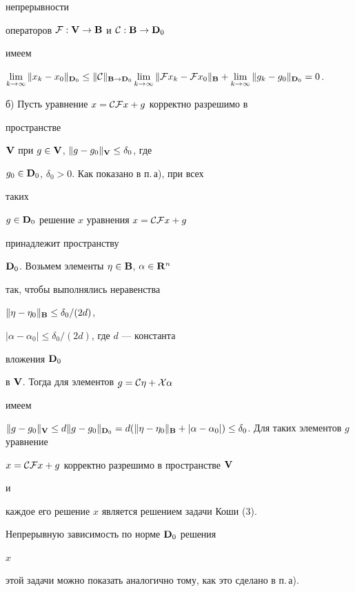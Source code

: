 \begin{pf}
непрерывности


операторов ${\cal F}:\spc{V}\to\spc{B}$ и ${\cal


C}:\spc{B}\to\spc{D}_0$


имеем


$\lim\limits_{k\to\infty}\|x_k-x_0\|_{\bold{D}_0}\le


\|{\cal C}\|_{\bold{B}\to{\bold{D}_0}}


\lim\limits_{k\to\infty}\|{\cal F}x_k-{\cal F}x_0\|_{\bold B}+


\lim\limits_{k\to\infty}\|g_k-g_0\|_{\bold{D}_0}=0$.





б) Пусть уравнение $x={\cal C}{\cal F}x+g$ корректно разрешимо в


пространстве


$\bold {V}$ при $g\in\bold {V}$, $\|g-g_0\|_{\bold V}\le\delta_0$, где


$g_0\in\bold {D}_0$, $\delta_0>0$. Как показано в п.\,а), при всех


таких


$g\in\bold {D}_0$ решение $x$ уравнения $x={\cal C}{\cal F}x+g$


принадлежит пространству


$\bold {D}_0$. Возьмем элементы $\eta\in\bold {B}$, $\alpha\in\bold {R}^n$


так, чтобы выполнялись неравенства


$\|\eta-\eta_0\|_{\bold B}\le\delta_0/(2d)$,


$|\alpha-\alpha_0|\le\delta_0/(2d)$, где $d$ --- константа


вложения $\bold {D}_0$


в $\bold {V}$. Тогда для элементов $g={\cal C}\eta+{\cal X}\alpha$


имеем


$\|g-g_0\|_{\bold V}\le


d\|g-g_0\|_{\bold{D}_0}=d(\|\eta-\eta_0\|_{\bold B}+


|\alpha-\alpha_0|)\le\delta_0$. Для таких элементов $g$ уравнение


$x={\cal C}{\cal F}x+g$ корректно разрешимо в пространстве $\bold {V}$


и


каждое его решение $x$ является решением задачи Коши (3).


Непрерывную зависимость по норме $\bold {D}_0$ решения


$x$


этой задачи можно показать аналогично тому, как это сделано в п.\,а).


\end{pf}





